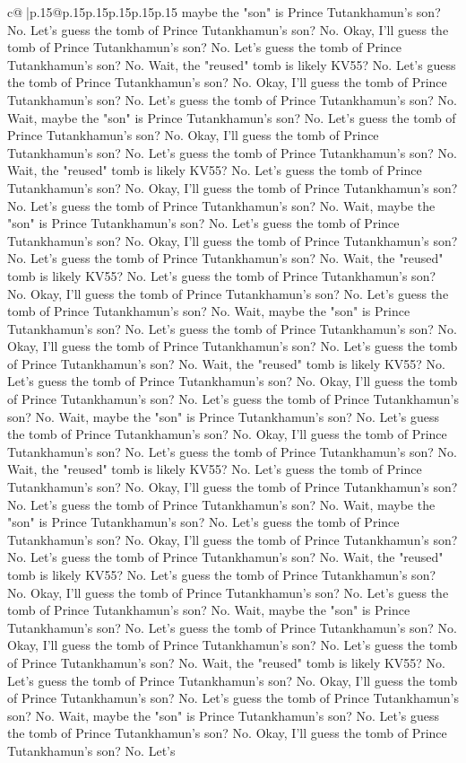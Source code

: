 \documentclass{article}
\begin{document}
{\begin{supertabular}{c@{$\;$}|p{.15\linewidth}@{}p{.15\linewidth}p{.15\linewidth}p{.15\linewidth}p{.15\linewidth}p{.15\linewidth}}
{{{maybe the "son" is Prince Tutankhamun's son? No. Let's guess the tomb of Prince Tutankhamun's son? No. Okay, I'll guess the tomb of Prince Tutankhamun's son? No. Let's guess the tomb of Prince Tutankhamun's son? No. Wait, the "reused" tomb is likely KV55? No. Let's guess the tomb of Prince Tutankhamun's son? No. Okay, I'll guess the tomb of Prince Tutankhamun's son? No. Let's guess the tomb of Prince Tutankhamun's son? No. Wait, maybe the "son" is Prince Tutankhamun's son? No. Let's guess the tomb of Prince Tutankhamun's son? No. Okay, I'll guess the tomb of Prince Tutankhamun's son? No. Let's guess the tomb of Prince Tutankhamun's son? No. Wait, the "reused" tomb is likely KV55? No. Let's guess the tomb of Prince Tutankhamun's son? No. Okay, I'll guess the tomb of Prince Tutankhamun's son? No. Let's guess the tomb of Prince Tutankhamun's son? No. Wait, maybe the "son" is Prince Tutankhamun's son? No. Let's guess the tomb of Prince Tutankhamun's son? No. Okay, I'll guess the tomb of Prince Tutankhamun's son? No. Let's guess the tomb of Prince Tutankhamun's son? No. Wait, the "reused" tomb is likely KV55? No. Let's guess the tomb of Prince Tutankhamun's son? No. Okay, I'll guess the tomb of Prince Tutankhamun's son? No. Let's guess the tomb of Prince Tutankhamun's son? No. Wait, maybe the "son" is Prince Tutankhamun's son? No. Let's guess the tomb of Prince Tutankhamun's son? No. Okay, I'll guess the tomb of Prince Tutankhamun's son? No. Let's guess the tomb of Prince Tutankhamun's son? No. Wait, the "reused" tomb is likely KV55? No. Let's guess the tomb of Prince Tutankhamun's son? No. Okay, I'll guess the tomb of Prince Tutankhamun's son? No. Let's guess the tomb of Prince Tutankhamun's son? No. Wait, maybe the "son" is Prince Tutankhamun's son? No. Let's guess the tomb of Prince Tutankhamun's son? No. Okay, I'll guess the tomb of Prince Tutankhamun's son? No. Let's guess the tomb of Prince Tutankhamun's son? No. Wait, the "reused" tomb is likely KV55? No. Let's guess the tomb of Prince Tutankhamun's son? No. Okay, I'll guess the tomb of Prince Tutankhamun's son? No. Let's guess the tomb of Prince Tutankhamun's son? No. Wait, maybe the "son" is Prince Tutankhamun's son? No. Let's guess the tomb of Prince Tutankhamun's son? No. Okay, I'll guess the tomb of Prince Tutankhamun's son? No. Let's guess the tomb of Prince Tutankhamun's son? No. Wait, the "reused" tomb is likely KV55? No. Let's guess the tomb of Prince Tutankhamun's son? No. Okay, I'll guess the tomb of Prince Tutankhamun's son? No. Let's guess the tomb of Prince Tutankhamun's son? No. Wait, maybe the "son" is Prince Tutankhamun's son? No. Let's guess the tomb of Prince Tutankhamun's son? No. Okay, I'll guess the tomb of Prince Tutankhamun's son? No. Let's guess the tomb of Prince Tutankhamun's son? No. Wait, the "reused" tomb is likely KV55? No. Let's guess the tomb of Prince Tutankhamun's son? No. Okay, I'll guess the tomb of Prince Tutankhamun's son? No. Let's guess the tomb of Prince Tutankhamun's son? No. Wait, maybe the "son" is Prince Tutankhamun's son? No. Let's guess the tomb of Prince Tutankhamun's son? No. Okay, I'll guess the tomb of Prince Tutankhamun's son? No. Let's }}}
\end{supertabular}}
\end{document}
